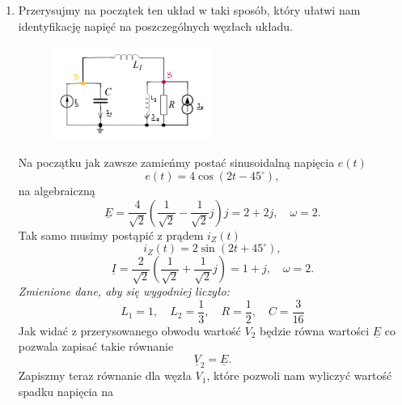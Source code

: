 \documentclass[12pt, a4paper]{article}
\begin{document}
\begin{enumerate}[label=\alph*)]
  \item Przerysujmy na początek ten układ w taki sposób, który ułatwi nam identyfikację
        napięć na poszczególnych węzłach układu.
        \begin{figure}[H]
          \centering
          \includegraphics[width = 0.5\textwidth]{./images/Lista_3/3.4.1.png}
        \end{figure}
        Na początku jak zawsze zamieńmy postać sinusoidalną napięcia $e(t)$
        \begin{equation*}
          e(t) = 4\cos(2t-45^\circ),
        \end{equation*}
        na algebraiczną
        \begin{equation*}
          \underline{E} = \frac{4}{\sqrt{2}}\left(\frac{1}{\sqrt{2}}-
          \frac{1}{\sqrt{2}}j\right)j = 2+2j, \quad \omega = 2.
        \end{equation*}
        Tak samo musimy postąpić z prądem $i_Z(t)$
        \begin{equation*}
          i_Z(t) = 2\sin(2t+45^\circ),
        \end{equation*}
        \begin{equation*}
          \underline{I} = \frac{2}{\sqrt{2}}\left(\frac{1}{\sqrt{2}}+
          \frac{1}{\sqrt{2}}j\right) = 1 + j, \quad \omega = 2.
        \end{equation*}
        \textit{Zmienione dane, aby się wygodniej liczyło:}
        \begin{equation*}
          L_1 = 1, \quad L_2 = \frac{1}{3}, \quad R = \frac{1}{2}, \quad
          C = \frac{3}{16}
        \end{equation*}
        Jak widać z przerysowanego obwodu wartość $V_2$ będzie równa wartości $\underline{E}$
        co pozwala zapisać takie równanie
        \begin{equation}\label{3.4a_V2}
          \underline{V}_2 = \underline{E}.
        \end{equation}
        Zapiszmy teraz równanie dla węzła $V_1$, które pozwoli nam wyliczyć wartość spadku napięcia na

\end{enumerate}
\end{document}

